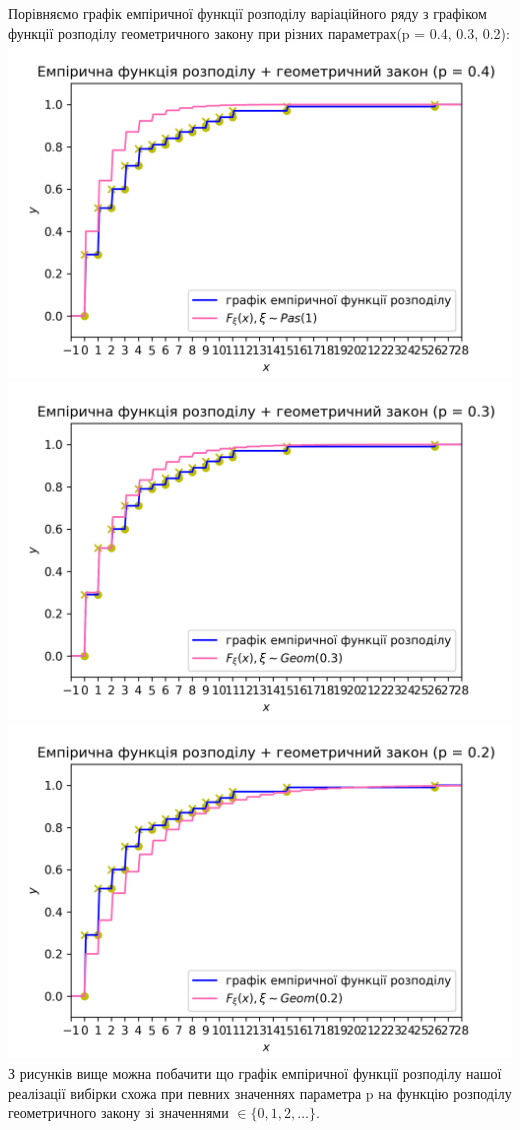 \documentclass{article}
\begin{document}
\newline
Порівняємо графік емпіричної функції розподілу варіаційного ряду 
з графіком функції розподілу геометричного закону при 
різних параметрах(p = 0.4, 0.3, 0.2):
\newline
\includegraphics[scale = 0.8]{func+geom4}
\newline
\includegraphics[scale = 0.8]{func+geom3}
\newline
\includegraphics[scale = 0.8]{func+geom2}
\newline
З рисунків вище можна побачити що графік емпіричної функції
розподілу нашої реалізації вибірки схожа при певних значеннях
параметра p на функцію розподілу геометричного закону зі 
значеннями $\in \{ 0, 1, 2, \dots \} $.
\end{document}
